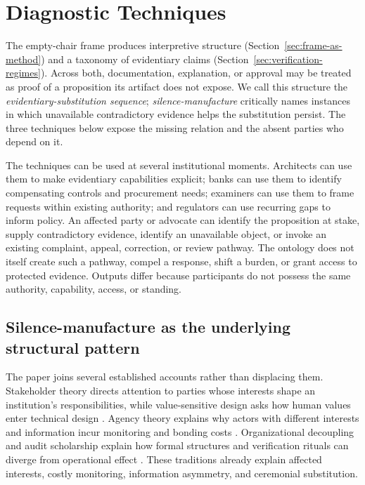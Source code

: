 
\section{Diagnostic Techniques}
\label{sec:diagnostics}

The empty-chair frame produces interpretive structure (Section~\ref{sec:frame-as-method}) and a taxonomy of evidentiary claims (Section~\ref{sec:verification-regimes}). Across both, documentation, explanation, or approval may be treated as proof of a proposition its artifact does not expose. We call this structure the \emph{evidentiary-substitution sequence}; \emph{silence-manufacture} critically names instances in which unavailable contradictory evidence helps the substitution persist. The three techniques below expose the missing relation and the absent parties who depend on it.

The techniques can be used at several institutional moments. Architects can use
them to make evidentiary capabilities explicit; banks can use them to identify
compensating controls and procurement needs; examiners can use them to frame
requests within existing authority; and regulators can use recurring gaps to
inform policy. An affected party or advocate can identify the proposition at
stake, supply contradictory evidence, identify an unavailable object, or invoke
an existing complaint, appeal, correction, or review pathway. The ontology does
not itself create such a pathway, compel a response, shift a burden, or grant
access to protected evidence. Outputs differ because participants do not possess
the same authority, capability, access, or standing.

\subsection{Silence-manufacture as the underlying structural pattern}
\label{sec:diagnostics:silence-manufacture}

The paper joins several established accounts rather than displacing them.
Stakeholder theory directs attention to parties whose interests shape an
institution's responsibilities, while value-sensitive design asks how human
values enter technical design \parencite{freeman1984,friedman1996}. Agency
theory explains why actors with different interests and information incur
monitoring and bonding costs \parencite{jensenMeckling1976}. Organizational
decoupling and audit scholarship explain how formal structures and verification
rituals can diverge from operational effect
\parencite{meyer1977,power1997,strathern1997}. These traditions already explain
affected interests, costly monitoring, information asymmetry, and ceremonial
substitution.

